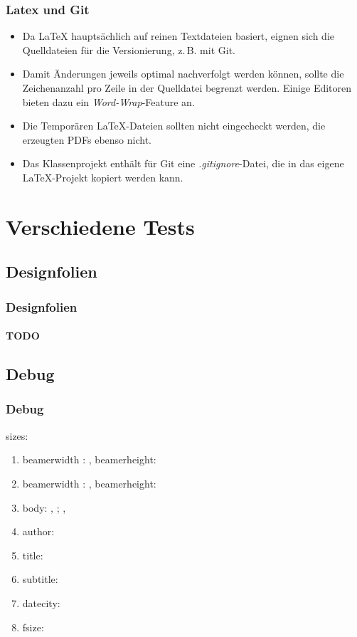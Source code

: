 \documentclass[german,notoc,draft]{tudbeamer}%
\begin{document}
\begin{frame}
	\frametitle{Latex und Git}
	\begin{itemize}
		\item Da LaTeX hauptsächlich auf reinen Textdateien basiert, eignen sich die Quelldateien für die Versionierung, z.\,B. mit Git.
		\item Damit Änderungen jeweils optimal nachverfolgt werden können, sollte die Zeichenanzahl pro Zeile in der Quelldatei begrenzt werden. Einige Editoren bieten dazu ein \emph{Word-Wrap}-Feature an.
		\item Die Temporären LaTeX-Dateien sollten nicht eingecheckt werden, die erzeugten PDFs ebenso nicht.
		\item Das Klassenprojekt enthält für Git eine \emph{.gitignore}-Datei, die in das eigene LaTeX-Projekt kopiert werden kann.
	\end{itemize}
\end{frame}

\section{Verschiedene Tests}	
\subsection{Designfolien}

\begin{frame}
	\frametitle{Designfolien}
	\framesubtitle{TODO}
\end{frame}


\subsection{Debug}
\makeatletter
\begin{frame}[allowframebreaks]
	\frametitle{Debug}
	sizes:
	\begin{enumerate}
		\item beamerwidth : \the\paperwidth, beamerheight: \the\paperheight
		\item beamerwidth : \number\paperwidth, beamerheight:\number\paperheight
		\item body: \the\bodyx, \the\bodyy; \the\bodywidth, \the\bodywidth
		\item author: \insertauthor
		\item title: \inserttitle
		\item subtitle: \insertsubtitle
		\item datecity: \insertdatecity
		\item fsize: \f@size
	\end{enumerate}
\end{frame}
\makeatother
\end{document}
